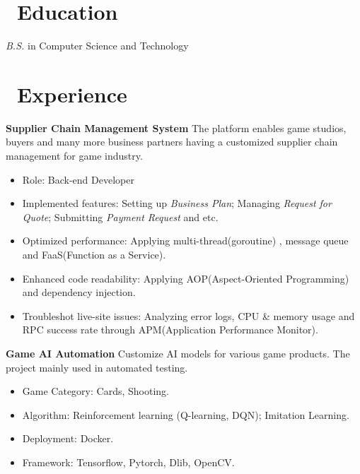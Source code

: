 \documentclass{resume}
\begin{document}



\section{\faGraduationCap\ Education}
\textit{B.S.} in Computer Science and Technology

\section{\faUsers\ Experience}
\textbf{Supplier Chain Management System}
\newline
The platform enables game studios, buyers and many more business partners having a customized supplier chain management for game industry.
\begin{itemize}
  \item Role: Back-end Developer
  \item Implemented features: Setting up \textit{Business Plan}; Managing \textit{Request for Quote}; Submitting \textit{Payment Request} and etc.
  \item Optimized performance: Applying multi-thread(goroutine) , message queue and FaaS(Function as a Service).
  \item Enhanced code readability: Applying AOP(Aspect-Oriented Programming) and dependency injection.
  \item Troubleshot live-site issues: Analyzing error logs, CPU \& memory usage and RPC success rate through APM(Application Performance Monitor).
\end{itemize}
\textbf{Game AI Automation}
\newline
Customize AI models for various game products. The project mainly used in automated testing.
\begin{itemize}
  \item Game Category: Cards, Shooting.
  \item Algorithm: Reinforcement learning (Q-learning, DQN); Imitation Learning.
  \item Deployment: Docker.
  \item Framework: Tensorflow, Pytorch, Dlib, OpenCV.
\end{itemize}
\end{document}
